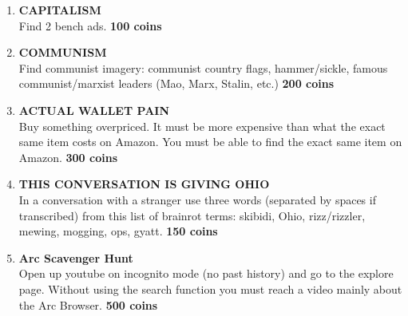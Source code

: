 \documentclass{article}
\begin{document}
\begin{enumerate}
    \item \textbf{CAPITALISM} \\ Find 2 bench ads. \textbf{100 coins}
    \item \textbf{COMMUNISM} \\ Find communist imagery: communist country flags, hammer/sickle, famous communist/marxist leaders (Mao, Marx, Stalin, etc.) \textbf{200 coins}
    \item \textbf{ACTUAL WALLET PAIN} \\ Buy something overpriced. It must be more expensive than what the exact same item costs on Amazon. You must be able to find the exact same item on Amazon. \textbf{300 coins}
    \item \textbf{THIS CONVERSATION IS GIVING OHIO} \\ In a conversation with a stranger use three words (separated by spaces if transcribed) from this list of brainrot terms: skibidi, Ohio, rizz/rizzler, mewing, mogging, ops, gyatt. \textbf{150 coins}
    \item \textbf{Arc Scavenger Hunt} \\ Open up youtube on incognito mode (no past history) and go to the explore page. Without using the search function you must reach a video mainly about the Arc Browser. \textbf{500 coins}

\end{enumerate}
\end{document}
